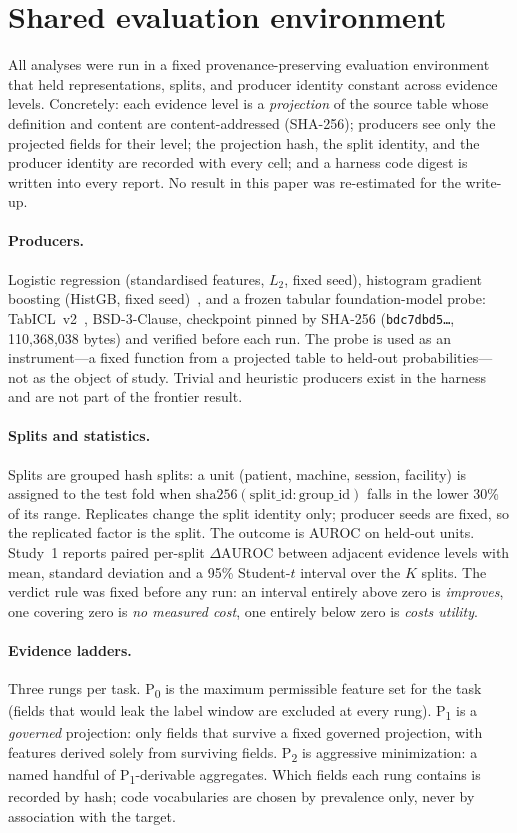 \documentclass[11pt]{article}
\newcommand{\pz}{P\textsubscript{0}}
\newcommand{\po}{P\textsubscript{1}}
\newcommand{\pt}{P\textsubscript{2}}
\newcommand{\dAUROC}{\ensuremath{\Delta\mathrm{AUROC}}}
\begin{document}
\section{Shared evaluation environment}
\label{sec:env}

All analyses were run in a fixed provenance-preserving evaluation environment that held representations, splits, and producer identity constant across evidence levels. Concretely: each evidence level is a \emph{projection} of the source table whose definition and content are content-addressed (SHA-256); producers see only the projected fields for their level; the projection hash, the split identity, and the producer identity are recorded with every cell; and a harness code digest is written into every report. No result in this paper was re-estimated for the write-up.

\paragraph{Producers.} Logistic regression (standardised features, $L_2$, fixed seed), histogram gradient boosting (HistGB, fixed seed)~\citep{sklearn}, and a frozen tabular foundation-model probe: TabICL~v2~\citep{tabicl}, BSD-3-Clause, checkpoint pinned by SHA-256 (\texttt{bdc7dbd5\ldots}, 110{,}368{,}038 bytes) and verified before each run. The probe is used as an instrument---a fixed function from a projected table to held-out probabilities---not as the object of study. Trivial and heuristic producers exist in the harness and are not part of the frontier result.

\paragraph{Splits and statistics.} Splits are grouped hash splits: a unit (patient, machine, session, facility) is assigned to the test fold when $\mathrm{sha256}(\text{split\_id}\!:\!\text{group\_id})$ falls in the lower 30\% of its range. Replicates change the split identity only; producer seeds are fixed, so the replicated factor is the split. The outcome is AUROC on held-out units. Study~1 reports paired per-split \dAUROC{} between adjacent evidence levels with mean, standard deviation and a 95\% Student-$t$ interval over the $K$ splits. The verdict rule was fixed before any run: an interval entirely above zero is \emph{improves}, one covering zero is \emph{no measured cost}, one entirely below zero is \emph{costs utility}.

\paragraph{Evidence ladders.} Three rungs per task. \pz{} is the maximum permissible feature set for the task (fields that would leak the label window are excluded at every rung). \po{} is a \emph{governed} projection: only fields that survive a fixed governed projection, with features derived solely from surviving fields. \pt{} is aggressive minimization: a named handful of \po-derivable aggregates. Which fields each rung contains is recorded by hash; code vocabularies are chosen by prevalence only, never by association with the target.
\end{document}
